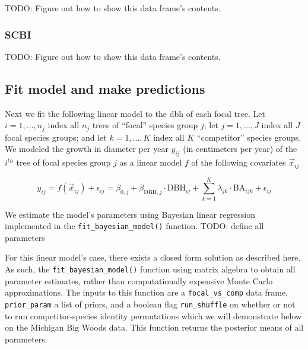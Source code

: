 \documentclass[12pt]{article}
\newenvironment{Shaded}{\begin{snugshade}}{\end{snugshade}}
\newcommand{\DataTypeTok}[1]{\textcolor[rgb]{0.13,0.29,0.53}{#1}}
\newcommand{\KeywordTok}[1]{\textcolor[rgb]{0.13,0.29,0.53}{\textbf{#1}}}
\newcommand{\NormalTok}[1]{#1}
\newcommand{\OperatorTok}[1]{\textcolor[rgb]{0.81,0.36,0.00}{\textbf{#1}}}
\newcommand{\StringTok}[1]{\textcolor[rgb]{0.31,0.60,0.02}{#1}}
\begin{document}
TODO: Figure out how to show this data frame's contents.

\hypertarget{scbi-2}{%
\subsubsection{SCBI}\label{scbi-2}}

\begin{Shaded}
\end{Shaded}

TODO: Figure out how to show this data frame's contents.

\hypertarget{model-fit-predict}{%
\subsection{Fit model and make predictions}\label{model-fit-predict}}

Next we fit the following linear model to the dbh of each focal tree.
Let \(i = 1, \ldots, n_j\) index all \(n_j\) trees of ``focal'' species
group \(j\); let \(j = 1, \ldots, J\) index all \(J\) focal species
groups; and let \(k = 1, \ldots, K\) index all \(K\) ``competitor''
species groups. We modeled the growth in diameter per year \(y_{ij}\)
(in centimeters per year) of the \(i^{th}\) tree of focal species group
\(j\) as a linear model \(f\) of the following covariates
\(\vec{x}_{ij}\)

\[
\newcommand{\dbh}{\text{DBH}}
\newcommand{\biomass}{\text{biomass}}
\newcommand{\BA}{\text{BA}}
y_{ij} = f(\vec{x}_{ij}) + \epsilon_{ij} = \beta_{0,j} + \beta_{\dbh,j} \cdot \dbh_{ij} + \sum_{k=1}^{K} \lambda_{jk} \cdot \BA_{ijk} + \epsilon_{ij}
\]

We estimate the model's parameters using Bayesian linear regression
implemented in the \texttt{fit\_bayesian\_model()} function. TODO:
define all parameters

For this linear model's case, there exists a closed form solution as
described here. As such, the \texttt{fit\_bayesian\_model()} function
using matrix algebra to obtain all parameter estimates, rather than
computationally expensive Monte Carlo approximations. The inputs to this
function are a \texttt{focal\_vs\_comp} data frame,
\texttt{prior\_param} a list of priors, and a boolean flag
\texttt{run\_shuffle} on whether or not to run competitor-species
identity permutations which we will demonstrate below on the Michigan
Big Woods data. This function returns the posterior means of all
parameters.
\end{document}
